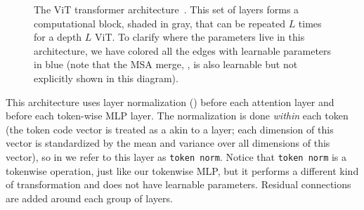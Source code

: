 \begin{figure}[h]
{\begin{minipage}{.49\linewidth}
        \end{minipage}
    }
    \caption{The ViT transformer architecture~\cite{dosovitskiy2020vit}. This set of layers forms a computational block, shaded in gray, that can be repeated $L$ times for a depth $L$ ViT. To clarify where the parameters live in this architecture, we have colored all the edges with learnable parameters in blue (note that the MSA merge, \eqn{\ref{eqn:transformers:MSA_merge}}, is also learnable but not explicitly shown in this diagram).}
    \label{fig:transformers:ViT_arch}
\end{figure}

This architecture uses layer normalization (\sect{\ref{sec:neural_nets:normalization_layers}}) before each attention layer and before each token-wise MLP layer. The normalization is done \textit{within} each token (the token code vector is treated as a akin to a layer; each dimension of this vector is standardized by the mean and variance over all dimensions of this vector), so in \fig{\ref{sec:neural_nets:normalization_layers}} we refer to this layer as \texttt{token norm}. Notice that \texttt{token norm} is a tokenwise operation, just like our tokenwise MLP, but it performs a different kind of transformation and does not have learnable parameters. Residual connections are added around each group of layers.


